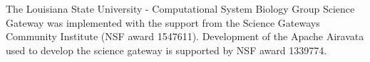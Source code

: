 \documentclass[sigconf]{acmart}
\begin{document}


\begin{acks}
The Louisiana State University - Computational System Biology Group Science Gateway was implemented with the support from the Science Gateways Community Institute (NSF award 1547611). Development of the Apache Airavata used to develop the science gateway is supported by NSF award 1339774. 

\end{acks}



\end{document}
